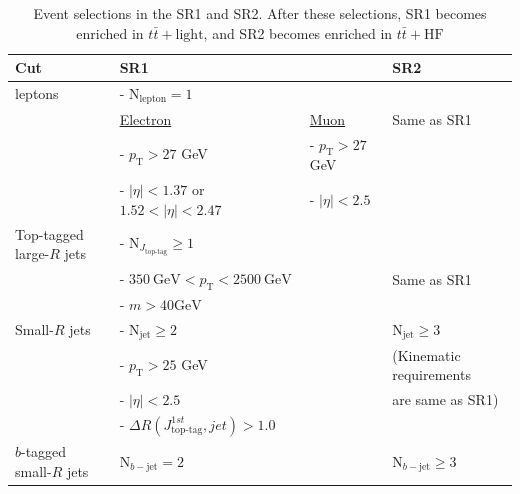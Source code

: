 \begin{table}[H]
  \centering
  \begin{tabular*}{170mm}{l|ll|l}
    \hline\hline
    Cut                       & SR1                                                         &                           & SR2\\
    \hline
    leptons                   &  - $\text{N}_{\text{lepton}}=1$                             &                           & \\
                              & \underline{Electron}                                        & \underline{Muon}          & Same as SR1\\
                              &  - $p_{\text{T}}>27$ GeV                                    &  - $p_{\text{T}}>27$ GeV  & \\
                              &  - $|\eta|<1.37$ or $1.52<|\eta|<2.47$                      &  - $|\eta|<2.5$           & \\
    \hline
    Top-tagged large-$R$ jets &  - $\text{N}_{J_{\text{top-tag}}} \geq 1$                   &                           &\\
                              &  - $350~\text{GeV}<p_{\text{T}}<2500~\text{GeV}$            &                           & Same as SR1\\
                              &  - $m>40\text{GeV}$                                         &                           & \\
    \hline
    Small-$R$ jets            &  - $\text{N}_{\text{jet}} \geq 2$                           &                           & $\text{N}_{\text{jet}} \geq 3$ \\
                              &  - $p_{\text{T}}>25$ GeV                                    &                           & (Kinematic requirements\\
                              &  - $|\eta|<2.5$                                             &                           &  are same as SR1)\\
                              &  - ${\Delta}R(J_{\text{top-tag}}^{1st}, jet)>1.0$           &                           & \\
    \hline
    $b$-tagged small-$R$ jets & $\text{N}_{b-\text{jet}} = 2$                               &                           & $\text{N}_{b-\text{jet}} \geq 3$\\

    \hline\hline
  \end{tabular*}
  \caption{Event selections in the SR1 and SR2. After these selections, SR1 becomes enriched in $t\bar{t}+\text{light}$, and SR2 becomes enriched in $t\bar{t}+\text{HF}$}
  \label{tab:EventSelectionInSR1AndSR2}
\end{table}

